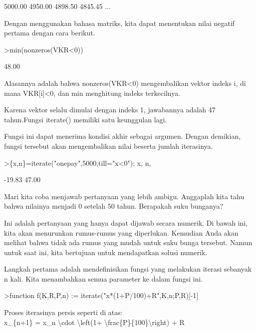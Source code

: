 \documentclass{article}
\newenvironment{eulernotebook}{\par}{\par}
\newenvironment{eulercomment}{\par\medskip}{\par\medskip}
\begin{document}
\begin{eulernotebook}
\begin{eulercomment}
\begin{eulercomment}
\begin{eulercomment}
\begin{eulercomment}
\begin{eulercomment}
\begin{eulercomment}
\begin{eulercomment}
\begin{eulercomment}
\begin{eulercomment}
\begin{eulercomment}
\begin{euleroutput}
      5000.00     4950.00     4898.50     4845.45     ...
\end{euleroutput}
\begin{eulercomment}
Dengan menggunakan bahasa matriks, kita dapat menentukan nilai negatif
pertama dengan cara berikut.
\end{eulercomment}
\begin{eulerprompt}
>min(nonzeros(VKR<0))
\end{eulerprompt}
\begin{euleroutput}
        48.00 
\end{euleroutput}
\begin{eulercomment}
Alasannya adalah bahwa nonzeros(VKR\textless{}0) mengembalikan vektor indeks i,
di mana VKR[i]\textless{}0, dan min menghitung indeks terkecilnya.

Karena vektor selalu dimulai dengan indeks 1, jawabannya adalah 47
tahun.Fungsi iterate() memiliki satu keunggulan lagi.

Fungsi ini dapat menerima kondisi akhir sebagai argumen. Dengan
demikian, fungsi tersebut akan mengembalikan nilai beserta jumlah
iterasinya.
\end{eulercomment}
\begin{eulerprompt}
>\{x,n\}=iterate("onepay",5000,till="x<0"); x, n,
\end{eulerprompt}
\begin{euleroutput}
       -19.83 
        47.00 
\end{euleroutput}
\begin{eulercomment}
Mari kita coba menjawab pertanyaan yang lebih ambigu. Anggaplah kita
tahu bahwa nilainya menjadi 0 setelah 50 tahun. Berapakah suku
bunganya?

Ini adalah pertanyaan yang hanya dapat dijawab secara numerik. Di
bawah ini, kita akan menurunkan rumus-rumus yang diperlukan. Kemudian
Anda akan melihat bahwa tidak ada rumus yang mudah untuk suku bunga
tersebut. Namun untuk saat ini, kita bertujuan untuk mendapatkan
solusi numerik.

Langkah pertama adalah mendefinisikan fungsi yang melakukan iterasi
sebanyak n kali. Kita menambahkan semua parameter ke dalam fungsi ini.
\end{eulercomment}
\begin{eulerprompt}
>function f(K,R,P,n) := iterate("x*(1+P/100)+R",K,n;P,R)[-1]
\end{eulerprompt}
\begin{eulercomment}
Proses iterasinya persis seperti di atas:\\
\textdollar{}\textdollar{}x\_\{n+1\} = x\_n \textbackslash{}cdot \textbackslash{}left(1+ \textbackslash{}frac\{P\}\{100\}\textbackslash{}right) + R\textdollar{}\textdollar{}


\end{eulercomment}
\end{eulercomment}
\end{eulercomment}
\end{eulercomment}
\end{eulercomment}
\end{eulercomment}
\end{eulercomment}
\end{eulercomment}
\end{eulercomment}
\end{eulercomment}
\end{eulercomment}
\end{eulernotebook}
\end{document}
